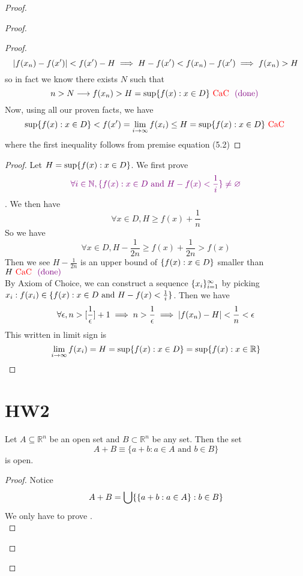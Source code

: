 \documentclass{report}
\begin{document}
\begin{proof}
\begin{proof}
\begin{proof}
\begin{equation}
\left|f(x_n)-f(x')\right|<f(x')-H\implies H-f(x')< f(x_n)-f(x')\implies f(x_n)>H
\end{equation}
so in fact we know there exists $N$ such that 
\begin{equation}
n>N \longrightarrow f(x_n)>H= \sup \{ f(x): x \in D \}\text{ \textcolor{red}{CaC} }\textcolor{violet}{\text{ (done) }}
\end{equation}
Now, using all our proven facts, we have
\begin{equation}
\sup \{ f(x): x\in D \}<f(x')=\lim_{i\to \infty }f(x_i)\leq H=\sup \{ f(x): x \in D \}\text{ \textcolor{red}{CaC} }
\end{equation}
where the first inequality follows from premise equation (5.2) 
\end{proof}
\begin{proof}
Let $H=\sup \{ f(x): x \in D \}$. We first prove
\begin{equation}
\textcolor{violet}{\forall i \in \mathbb{N}, \{ f(x): x \in D\text{ and }H-f(x)<\frac{1}{i} \}\neq \varnothing}
\end{equation}
. We then have
\begin{equation}
\forall x\in D, H\geq f(x)+\frac{1}{n}
\end{equation}
So we have
\begin{equation}
\forall x\in D, H-\frac{1}{2n}\geq f(x)+\frac{1}{2n}>f(x)
\end{equation}
Then we see $H-\frac{1}{2n}$ is an upper bound of $\{ f(x): x \in D \}$ smaller than $H\text{ \textcolor{red}{CaC} }\textcolor{violet}{\text{ (done) }}$\\

By Axiom of Choice, we can construct a sequence $\{ x_i \}_{i=1}^\infty$ by picking $x_i: f(x_i)\in \{ f(x):x \in D\text{ and }H-f(x)<\frac{1}{i} \}$. Then we have
\begin{equation}
\forall \epsilon, n> [\frac{1}{\epsilon }]+1\implies n>\frac{1}{\epsilon }\implies \left|f(x_n)-H\right|<\frac{1}{n}<\epsilon 
\end{equation}
This written in limit sign is 
\begin{equation}
\lim_{i\to \infty}f(x_i)=H=\sup \{ f(x): x\in D \}=\sup \{ f(x):x \in\mathbb{R} \}
\end{equation}
\end{proof}
\section{HW2}
\begin{question}{}{}

Let \(A \subseteq \mathbb{R}^n\) be an open set and \(B \subset \mathbb{R}^n\) be any set. Then the set 
\[ A + B \equiv \{a + b : a \in A \text{ and } b \in B\} \]
is open.
\end{question}
\begin{proof}
Notice 
\begin{equation}
A+B= \bigcup \{ \{ a+b:a\in A \}:b\in B \}
\end{equation}
We only have to prove  .\\


\end{proof}
\end{proof}
\end{proof}
\end{document}
